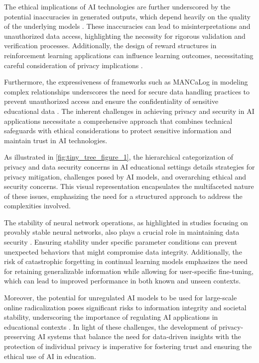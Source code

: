 The ethical implications of AI technologies are further underscored by the potential inaccuracies in generated outputs, which depend heavily on the quality of the underlying models \cite{zolfaghari2023surveyautomateddetectionclassification}. These inaccuracies can lead to misinterpretations and unauthorized data access, highlighting the necessity for rigorous validation and verification processes. Additionally, the design of reward structures in reinforcement learning applications can influence learning outcomes, necessitating careful consideration of privacy implications \cite{wang2019pairedopenendedtrailblazerpoet}.

Furthermore, the expressiveness of frameworks such as MANCaLog in modeling complex relationships underscores the need for secure data handling practices to prevent unauthorized access and ensure the confidentiality of sensitive educational data \cite{shakarian2022reasoningcomplexnetworkslogic}. The inherent challenges in achieving privacy and security in AI applications necessitate a comprehensive approach that combines technical safeguards with ethical considerations to protect sensitive information and maintain trust in AI technologies. 

As illustrated in \autoref{fig:tiny_tree_figure_1}, the hierarchical categorization of privacy and data security concerns in AI educational settings details strategies for privacy mitigation, challenges posed by AI models, and overarching ethical and security concerns. This visual representation encapsulates the multifaceted nature of these issues, emphasizing the need for a structured approach to address the complexities involved.

The stability of neural network operations, as highlighted in studies focusing on provably stable neural networks, also plays a crucial role in maintaining data security \cite{stogin2022provablystableneuralnetwork}. Ensuring stability under specific parameter conditions can prevent unexpected behaviors that might compromise data integrity. Additionally, the risk of catastrophic forgetting in continual learning models emphasizes the need for retaining generalizable information while allowing for user-specific fine-tuning, which can lead to improved performance in both known and unseen contexts.

Moreover, the potential for unregulated AI models to be used for large-scale online radicalization poses significant risks to information integrity and societal stability, underscoring the importance of regulating AI applications in educational contexts \cite{mcguffie2020radicalizationrisksgpt3advanced}. In light of these challenges, the development of privacy-preserving AI systems that balance the need for data-driven insights with the protection of individual privacy is imperative for fostering trust and ensuring the ethical use of AI in education.

